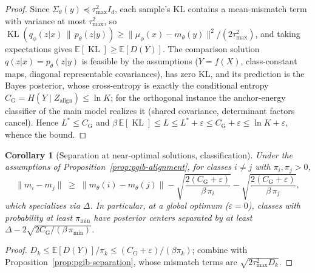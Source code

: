 \documentclass{article}
\theoremstyle{plain}
\newtheorem{corollary}{Corollary}[section]
\theoremstyle{remark}
\newcommand{\E}{\mathbb{E}}
\DeclareMathOperator{\KL}{KL}
\begin{document}
\begin{proof}
Since $\Sigma_\theta(y) \preceq \tau^2_{\max} I_d$, each sample's KL contains a
mean-mismatch term with variance at most $\tau^2_{\max}$, so
$\KL(q_\phi(z|x)\,\|\,p_\theta(z|y))
\ge \|\mu_\phi(x) - m_\theta(y)\|^2/(2\tau^2_{\max})$, and taking expectations gives
$\E[\KL] \ge \E[D(Y)]$. The comparison solution $q(z|x) = p_\theta(z|y)$ is feasible
by the assumptions ($Y = f(X)$, class-constant maps, diagonal representable
covariances), has zero KL, and its prediction is the Bayes posterior, whose
cross-entropy is exactly the conditional entropy
$C_{\mathrm{G}} = H(Y \mid Z_{\mathrm{align}}) \le \ln K$; for the orthogonal
instance the anchor-energy classifier of the main model realizes it (shared
covariance, determinant factors cancel). Hence $L^* \le C_{\mathrm{G}}$ and
$\beta\,\E[\KL] \le L \le L^* + \varepsilon \le C_{\mathrm{G}} + \varepsilon \le \ln K + \varepsilon$,
whence the bound.
\end{proof}

\begin{corollary}[Separation at near-optimal solutions, classification]
\label{cor:pgib-alignment-separation}
Under the assumptions of Proposition~\ref{prop:pgib-alignment}, for classes
$i \ne j$ with $\pi_i, \pi_j > 0$,
\begin{equation}
\|m_i - m_j\| \;\ge\; \|m_\theta(i) - m_\theta(j)\|
- \sqrt{\frac{2(C_{\mathrm{G}} + \varepsilon)}{\beta\,\pi_i}}
- \sqrt{\frac{2(C_{\mathrm{G}} + \varepsilon)}{\beta\,\pi_j}} ,
\end{equation}
which specializes via $\Delta$. In particular, at a global optimum
($\varepsilon = 0$), classes with probability at least $\pi_{\min}$ have posterior
centers separated by at least
$\Delta - 2\sqrt{2C_{\mathrm{G}}/(\beta\,\pi_{\min})}$.
\end{corollary}

\begin{proof}
$D_k \le \E[D(Y)]/\pi_k \le (C_{\mathrm{G}} + \varepsilon)/(\beta \pi_k)$; combine
with Proposition~\ref{prop:pgib-separation}, whose mismatch terms are
$\sqrt{2\tau^2_{\max} D_k}$.
\end{proof}
\end{document}
